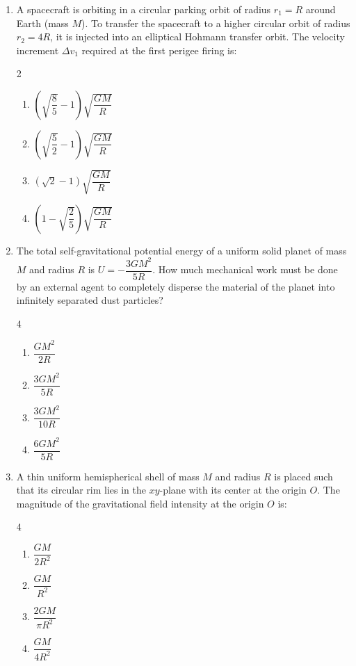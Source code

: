 \documentclass[11pt,a4paper]{article}
\begin{document}
\begin{enumerate}[label=\textbf{\arabic*.},leftmargin=18pt,itemsep=10pt]
  \item A spacecraft is orbiting in a circular parking orbit of radius $r_1 = R$ around Earth (mass $M$). To transfer the spacecraft to a higher circular orbit of radius $r_2 = 4R$, it is injected into an elliptical Hohmann transfer orbit. The velocity increment $\Delta v_1$ required at the first perigee firing is:
  \begin{multicols}{2}
    \begin{enumerate}[label=(\Alph*)]
      \item $\left(\sqrt{\dfrac{8}{5}} - 1\right)\sqrt{\dfrac{GM}{R}}$
      \item $\left(\sqrt{\dfrac{5}{2}} - 1\right)\sqrt{\dfrac{GM}{R}}$
      \item $\left(\sqrt{2} - 1\right)\sqrt{\dfrac{GM}{R}}$
      \item $\left(1 - \sqrt{\dfrac{2}{5}}\right)\sqrt{\dfrac{GM}{R}}$
    \end{enumerate}
  \end{multicols}

  \item The total self-gravitational potential energy of a uniform solid planet of mass $M$ and radius $R$ is $U = -\dfrac{3GM^2}{5R}$. How much mechanical work must be done by an external agent to completely disperse the material of the planet into infinitely separated dust particles?
  \begin{multicols}{4}
    \begin{enumerate}[label=(\Alph*)]
      \item $\dfrac{GM^2}{2R}$
      \item $\dfrac{3GM^2}{5R}$
      \item $\dfrac{3GM^2}{10R}$
      \item $\dfrac{6GM^2}{5R}$
    \end{enumerate}
  \end{multicols}

  \item A thin uniform hemispherical shell of mass $M$ and radius $R$ is placed such that its circular rim lies in the $xy$-plane with its center at the origin $O$. The magnitude of the gravitational field intensity at the origin $O$ is:
  \begin{multicols}{4}
    \begin{enumerate}[label=(\Alph*)]
      \item $\dfrac{GM}{2R^2}$
      \item $\dfrac{GM}{R^2}$
      \item $\dfrac{2GM}{\pi R^2}$
      \item $\dfrac{GM}{4R^2}$
    \end{enumerate}
  \end{multicols}


\end{enumerate}
\end{document}
